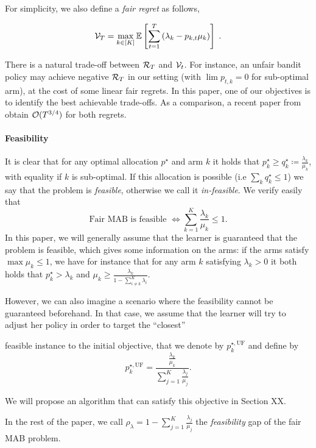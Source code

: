 For simplicity, we also define a \emph{fair regret} as follows, 

\[ \mathcal{V}_T = \max_{k \in [K]} \mathbb{E}\left[\sum_{t=1}^T \left(\lambda_k-p_{k,t} \mu_k \right)\right] \;. \]

There is a natural trade-off between $\mathcal{R}_T$ and $\mathcal{V}_t$. For instance, an unfair bandit policy may achieve negative $\mathcal{R}_T$ in our setting (with $\lim p_{t,k}=0$ for sub-optimal arm), at the cost of some linear fair regrets. In this paper, one of our objectives is to identify the best achievable trade-offs. As a comparison, a recent paper from 
\cite{sinha2023banditq} obtain $\mathcal{O}(T^{3/4})$ for both regrets.


\paragraph{Feasibility} It is clear that for any optimal allocation $p^\star$ and arm $k$ it holds that $p_k^\star\geq q_k^\star \coloneqq \frac{\lambda_k}{\mu_k}$, with equality if $k$ is sub-optimal. If this allocation is possible (i.e $\sum_k q_k^\star\leq 1$) we say that the problem is \emph{feasible}, otherwise we call it \emph{in-feasible}. We verify easily that 
\[\text{Fair MAB is feasible } \Longleftrightarrow \sum_{k=1}^K \frac{\lambda_k}{\mu_k}\leq 1. \]
In this paper, we will generally assume that the learner is guaranteed that the problem is feasible, which gives some information on the arms: if the arms satisfy $\max \mu_k \leq 1$, we have for instance that for any arm $k$ satisfying $\lambda_k>0$ it both holds that $p_k^\star>\lambda_k$ and $\mu_k \geq \frac{\lambda_k}{1-\sum_{i\neq k}^K \lambda_i}$. 

However, we can also imagine a scenario where the feasibility cannot be guaranteed beforehand. In that case, we assume that the learner will try to adjust her policy in order to target the ``closest''

feasible instance to the initial objective, that we denote by $p_k^{\star, \text{UF}}$ and define by  
\[p_k^{\star, \text{UF}}= \frac{\frac{\lambda_k}{\mu_k}}{\sum_{j=1}^K\frac{\lambda_j}{\mu_j}}.\]


We will propose an algorithm that can satisfy this objective in Section XX.

In the rest of the paper, we call $\rho_\lambda = 1-\sum_{j=1}^K\frac{\lambda_j}{\mu_j}$ the \emph{feasibility} gap of the fair MAB problem. 